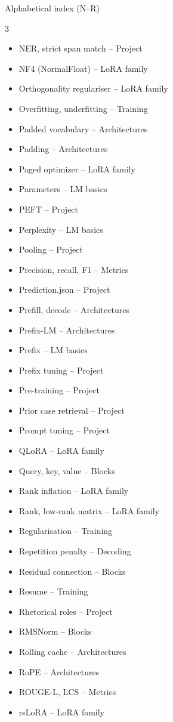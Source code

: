 \documentclass[aspectratio=169,11pt]{beamer}
\begin{document}
\begin{frame}{Alphabetical index (N--R)}
  \footnotesize
  \begin{multicols}{3}
  \begin{itemize}\setlength{\itemsep}{0pt}
    \item NER, strict span match -- Project
    \item NF4 (NormalFloat) -- LoRA family
    \item Orthogonality regulariser -- LoRA family
    \item Overfitting, underfitting -- Training
    \item Padded vocabulary -- Architectures
    \item Padding -- Architectures
    \item Paged optimizer -- LoRA family
    \item Parameters -- LM basics
    \item PEFT -- Project
    \item Perplexity -- LM basics
    \item Pooling -- Project
    \item Precision, recall, F1 -- Metrics
    \item Prediction.json -- Project
    \item Prefill, decode -- Architectures
    \item Prefix-LM -- Architectures
    \item Prefix -- LM basics
    \item Prefix tuning -- Project
    \item Pre-training -- Project
    \item Prior case retrieval -- Project
    \item Prompt tuning -- Project
    \item QLoRA -- LoRA family
    \item Query, key, value -- Blocks
    \item Rank inflation -- LoRA family
    \item Rank, low-rank matrix -- LoRA family
    \item Regularisation -- Training
    \item Repetition penalty -- Decoding
    \item Residual connection -- Blocks
    \item Resume -- Training
    \item Rhetorical roles -- Project
    \item RMSNorm -- Blocks
    \item Rolling cache -- Architectures
    \item RoPE -- Architectures
    \item ROUGE-L, LCS -- Metrics
    \item rsLoRA -- LoRA family
  \end{itemize}
  \end{multicols}
\end{frame}
\end{document}
